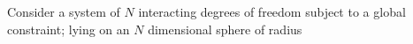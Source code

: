 Consider a system of $N$ interacting degrees of freedom subject to a global constraint; lying on an $N$ dimensional sphere of radius $$